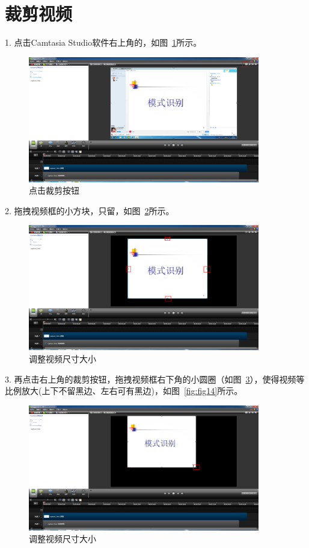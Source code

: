 \documentclass[12pt]{article}
\begin{document}
\section{裁剪视频}
1. 点击Camtasia Studio软件右上角的{\color{blue}{裁剪按钮}}，如图~\ref{fig:fig11}所示。\par
     \begin{figure}
    \centering
    \includegraphics[width=0.9\textwidth]{fig11.png}
    \caption{点击裁剪按钮}
    \label{fig:fig11}
    \end{figure}
2. 拖拽视频框的小方块，只留{\color{blue}{ppt部分}}，如图~\ref{fig:fig12}所示。\par
     \begin{figure}
    \centering
    \includegraphics[width=0.9\textwidth]{fig12.png}
    \caption{调整视频尺寸大小}
    \label{fig:fig12}
    \end{figure}
3. 再点击右上角的裁剪按钮，拖拽视频框右下角的小圆圈（如图~\ref{fig:fig13}），使得视频等比例放大(上下不留黑边、左右可有黑边)，如图~\ref{fig:fig14}所示。\par
     \begin{figure}
    \centering
    \includegraphics[width=0.9\textwidth]{fig13.png}
    \caption{调整视频尺寸大小}
    \label{fig:fig13}
    \end{figure}
\end{document}
